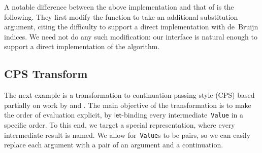 \documentclass[9pt,preprint,authoryear]{sigplanconf}
\begin{document}
%
A notable difference between the above implementation and that of
    \citeauthor{guillemette_type-preserving_2007} is the following.
    They first modify the
    function to take an additional substitution argument, citing the
    difficulty to support a direct implementation with de{~}Bruijn
    indices. We need not do any such modification{:} our interface is
    natural enough to support a direct implementation of the algorithm.%


\subsection{CPS Transform\label{cpsSec}}

%
The next example is a transformation to continuation-passing
    style (CPS) based partially on work by \citet{chlipala_parametric_2008} and
    \citet{guillemette_type-preserving_2008}.
    The main objective of the transformation is to make the
    order of evaluation explicit, by $ \mathsf{let} $-binding every intermediate{~}\textcolor[rgb]{0,0,0.80}{\texttt{Value}} in
    a specific order. To this end, we target a special representation,
    where every intermediate result is named. We allow for{~}\textcolor[rgb]{0,0,0.80}{\texttt{Value}}s to be
    pairs, so we can easily replace each argument with a pair of an
    argument and a continuation.%


{\nopagebreak }
\end{document}
